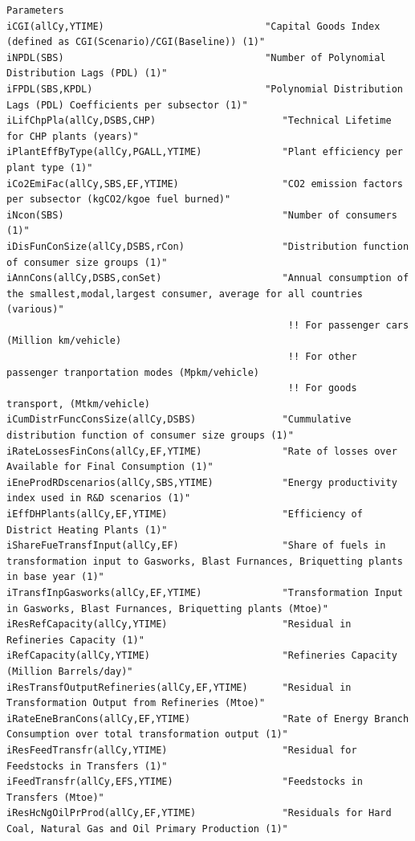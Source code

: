 \documentclass[a4paper,]{scrartcl}
\begin{document}
\begin{lstlisting}
Parameters
iCGI(allCy,YTIME)                            "Capital Goods Index (defined as CGI(Scenario)/CGI(Baseline)) (1)"
iNPDL(SBS)                                   "Number of Polynomial Distribution Lags (PDL) (1)"
iFPDL(SBS,KPDL)                              "Polynomial Distribution Lags (PDL) Coefficients per subsector (1)"
iLifChpPla(allCy,DSBS,CHP)                      "Technical Lifetime for CHP plants (years)"
iPlantEffByType(allCy,PGALL,YTIME)              "Plant efficiency per plant type (1)"
iCo2EmiFac(allCy,SBS,EF,YTIME)                  "CO2 emission factors per subsector (kgCO2/kgoe fuel burned)"
iNcon(SBS)                                      "Number of consumers (1)"
iDisFunConSize(allCy,DSBS,rCon)                 "Distribution function of consumer size groups (1)"
iAnnCons(allCy,DSBS,conSet)                     "Annual consumption of the smallest,modal,largest consumer, average for all countries (various)"
                                                 !! For passenger cars (Million km/vehicle)
                                                 !! For other passenger tranportation modes (Mpkm/vehicle)
                                                 !! For goods transport, (Mtkm/vehicle)  
iCumDistrFuncConsSize(allCy,DSBS)               "Cummulative distribution function of consumer size groups (1)"
iRateLossesFinCons(allCy,EF,YTIME)              "Rate of losses over Available for Final Consumption (1)" 
iEneProdRDscenarios(allCy,SBS,YTIME)            "Energy productivity index used in R&D scenarios (1)" 
iEffDHPlants(allCy,EF,YTIME)                    "Efficiency of District Heating Plants (1)" 
iShareFueTransfInput(allCy,EF)                  "Share of fuels in transformation input to Gasworks, Blast Furnances, Briquetting plants in base year (1)"
iTransfInpGasworks(allCy,EF,YTIME)              "Transformation Input in Gasworks, Blast Furnances, Briquetting plants (Mtoe)"
iResRefCapacity(allCy,YTIME)                    "Residual in Refineries Capacity (1)"
iRefCapacity(allCy,YTIME)                       "Refineries Capacity (Million Barrels/day)"
iResTransfOutputRefineries(allCy,EF,YTIME)      "Residual in Transformation Output from Refineries (Mtoe)"
iRateEneBranCons(allCy,EF,YTIME)                "Rate of Energy Branch Consumption over total transformation output (1)"
iResFeedTransfr(allCy,YTIME)                    "Residual for Feedstocks in Transfers (1)"  
iFeedTransfr(allCy,EFS,YTIME)                   "Feedstocks in Transfers (Mtoe)"
iResHcNgOilPrProd(allCy,EF,YTIME)               "Residuals for Hard Coal, Natural Gas and Oil Primary Production (1)"

\end{lstlisting}
\end{document}
